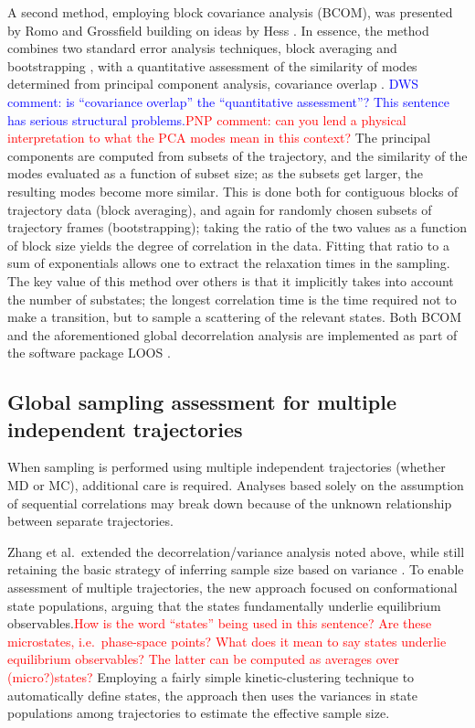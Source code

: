 A second method, employing block covariance analysis (BCOM), was presented by Romo and Grossfield \cite{Romo2011} building on ideas by Hess \cite{Hess2002}.  In essence, the method combines two standard error analysis techniques, block averaging \cite{Flyvbjerg-1989} and bootstrapping \cite{Tibshirani1998}, with a quantitative assessment of the similarity of modes determined from principal component analysis, covariance overlap \cite{Hess2002}.
\textcolor{blue}{DWS comment: is ``covariance overlap'' the ``quantitative assessment''? This sentence has serious structural problems.}\textcolor{red}{PNP comment: can you lend a physical interpretation to what the PCA modes mean in this context?}
The principal components are computed from subsets of the trajectory, and the similarity of the modes evaluated as a function of subset size; as the subsets get larger, the resulting modes become more similar.  This is done both for contiguous blocks of trajectory data (block averaging), and again for randomly chosen subsets of trajectory frames (bootstrapping); taking the ratio of the two values as a function of block size yields the degree of correlation in the data.  Fitting that ratio to a sum of exponentials allows one to extract the relaxation times in the sampling.  The key value of this method over others is that it implicitly takes into account the number of substates; the longest correlation time is the time required not to make a transition, but to sample a scattering of the relevant states. Both BCOM and the aforementioned global decorrelation analysis are implemented as part of the software package LOOS \cite{LOOS,LOOS-JCC}.

\subsection{Global sampling assessment for multiple independent trajectories}
When sampling is performed using multiple independent trajectories (whether MD or MC), additional care is required.
Analyses based solely on the assumption of sequential correlations may break down because of the unknown relationship between separate trajectories.

Zhang et al.\ extended the decorrelation/variance analysis noted above, while still retaining the basic strategy of inferring sample size based on variance \cite{Zhang2010}.
To enable assessment of multiple trajectories, the new approach focused on conformational state populations, arguing that the states fundamentally underlie equilibrium observables.\textcolor{red}{How is the word ``states'' being used in this sentence?  Are these microstates, i.e.\ phase-space points?  What does it mean to say states underlie equilibrium observables?  The latter can be computed as averages over (micro?)states?}
Employing a fairly simple kinetic-clustering technique to automatically define states, the approach then uses the variances in state populations among trajectories to estimate the effective sample size.  %

